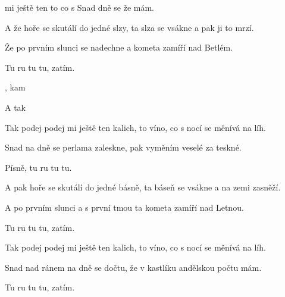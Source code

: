 

\zs
{}  mi ještě ten  
to  co s   
Snad  dně se 
že   mám. 
 
\ks

\zs
A že hoře se skutálí do jedné slzy,
ta slza se vsákne a pak ji to mrzí.

Že po prvním slunci se nadechne
a kometa zamíří nad Betlém.

Tu ru tu tu, zatím.
\ks

\zr
{}  , kam 

   

A tak    
   
\kr

\zs
Tak podej podej mi ještě ten kalich,
to víno, co s nocí se měnívá na líh.

Snad na dně se perlama zaleskne,
pak vyměním veselé za teskné.

Písně, tu ru tu tu.
\ks

\zs
A pak hoře se skutálí do jedné básně,
ta báseň se vsákne a na zemi zasněží.

A po prvním slunci a s první tmou
ta kometa zamíří nad Letnou.

Tu ru tu tu, zatím.
\ks

\zr
\kr

\zs
Tak podej podej mi ještě ten kalich,
to víno, co s nocí se měnívá na líh.

Snad nad ránem na dně se dočtu,
že v kastlíku andělskou počtu mám.

Tu ru tu tu, zatím.
\ks

\zr
\kr

\kp

